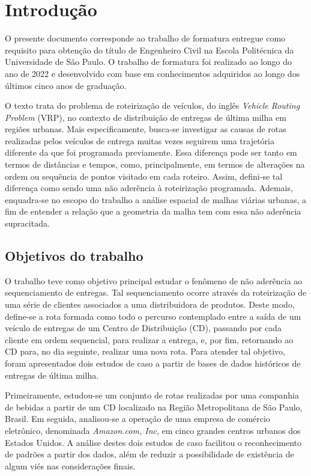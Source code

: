 \chapter{Introdução} \label{sec:introduction}

O presente documento corresponde ao trabalho de formatura entregue como requisito para obtenção do título de Engenheiro Civil na Escola Politécnica da Universidade de São Paulo.
O trabalho de formatura foi realizado ao longo do ano de 2022 e desenvolvido com base em conhecimentos adquiridos ao longo dos últimos cinco anos de graduação.

O texto trata do problema de roteirização de veículos, do inglês \textit{Vehicle Routing Problem} (VRP), no contexto de distribuição de entregas de última milha em regiões urbanas. 
Mais especificamente, busca-se investigar as causas de rotas realizadas pelos veículos de entrega muitas vezes seguirem uma trajetória diferente da que foi programada previamente.
Essa diferença pode ser tanto em termos de distâncias e tempos, como, principalmente, em termos de alterações na ordem ou sequência de pontos visitado em cada roteiro. Assim, defini-se tal diferença como sendo uma não aderência à roteirização programada.
Ademais, enquadra-se no escopo do trabalho a análise espacial de malhas viárias urbanas, a fim de entender a relação que a geometria da malha tem com essa não aderência supracitada.

\section{Objetivos do trabalho} \label{objetivos}

O trabalho teve como objetivo principal estudar o fenômeno de não aderência ao sequenciamento de entregas. Tal sequenciamento ocorre através da roteirização de uma série de clientes associados a uma distribuidora de produtos. Deste modo, define-se a rota formada como todo o percurso contemplado entre a saída de um veículo de entregas de um Centro de Distribuição (CD), passando por cada cliente em ordem sequencial, para realizar a entrega, e, por fim, retornando ao CD para, no dia seguinte, realizar uma nova rota.
Para atender tal objetivo, foram apresentados dois estudos de caso a partir de bases de dados históricos de entregas de última milha.

Primeiramente, estudou-se um conjunto de rotas realizadas por uma companhia de bebidas a partir de um CD localizado na Região Metropolitana de São Paulo, Brasil.
Em seguida, analisou-se a operação de uma empresa de comércio eletrônico, denominada \textit{Amazon.com, Inc}, em cinco grandes centros urbanos dos Estados Unidos.
A análise destes dois estudos de caso facilitou o reconhecimento de padrões a partir dos dados, além de reduzir a possibilidade de existência de algum viés nas considerações finais.

